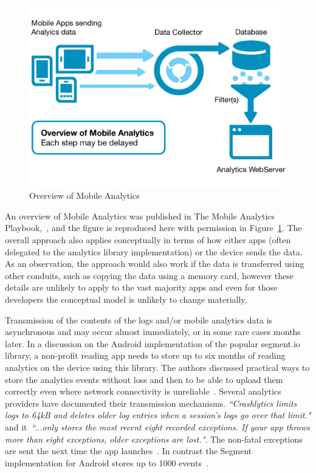 \begin{figure}
    \includegraphics[width=\linewidth]{images/mobile-analytics-playbook/overview-of-mobile-analytics.pdf}
    \caption{Overview of Mobile Analytics~\cite{harty_aymer_playbook_2016}}
    \label{fig:map2016-overview-of-mobile-analytics}
\end{figure}

An overview of Mobile Analytics was published in The Mobile Analytics Playbook,~, and the figure is reproduced here with permission in Figure~\ref{fig:map2016-overview-of-mobile-analytics}. The overall approach also applies conceptually in terms of how either apps (often delegated to the analytics library implementation) or the device sends the data. As an observation, the approach would also work if the data is transferred using other conduits, such as copying the data using a memory card, however these details are unlikely to apply to the vast majority apps and even for those developers the conceptual model is unlikely to change materially.

Transmission of the contents of the logs and/or mobile analytics data is asynchronous and may occur almost immediately, or in some rare cases months later. In a discussion on the Android implementation of the popular segment.io library, a non-profit reading app needs to store up to six months of reading analytics on the device using this library. The authors discussed practical ways to store the analytics events without loss and then to be able to upload them correctly even where network connectivity is unreliable~. Several analytics providers have documented their transmission mechanisms. \emph{``Crashlytics limits logs to 64kB and deletes older log entries when a session's logs go over that limit."} and it~\emph{``...only stores the most recent eight recorded exceptions. If your app throws more than eight exceptions, older exceptions are lost."}.  The non-fatal exceptions are sent the next time the app launches~. In contrast the Segment implementation for Android stores up to 1000 events~.

